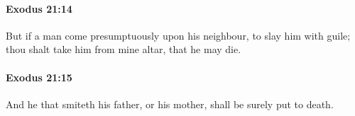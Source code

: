 		\paragraph{Exodus 21:14} %
			\label{EXODUS-21-14}

			But if a man come presumptuously upon his neighbour, to slay him with guile; thou shalt take him from mine altar, that he may die.


		\paragraph{Exodus 21:15} %
			\label{EXODUS-21-15}

			And he that smiteth his father, or his mother, shall be surely put to death.


